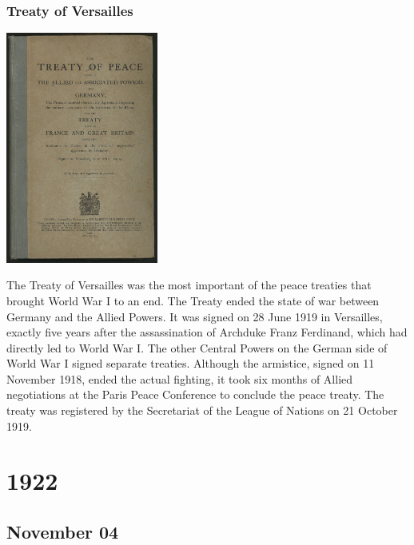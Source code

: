 \documentclass[11pt]{report}
\begin{document}
\subsection{Treaty of Versailles}
\vspace{2mm}\begin{center}\includegraphics[width=5cm]{./img/treatyOfVersailles.jpg}\end{center}
The Treaty of Versailles was the most important of the peace treaties that brought World War I to an end. The Treaty ended the state of war between Germany and the Allied Powers. It was signed on 28 June 1919 in Versailles, exactly five years after the assassination of Archduke Franz Ferdinand, which had directly led to World War I. The other Central Powers on the German side of World War I signed separate treaties. Although the armistice, signed on 11 November 1918, ended the actual fighting, it took six months of Allied negotiations at the Paris Peace Conference to conclude the peace treaty. The treaty was registered by the Secretariat of the League of Nations on 21 October 1919.

\chapter{1922}
\section{November 04}
\end{document}
